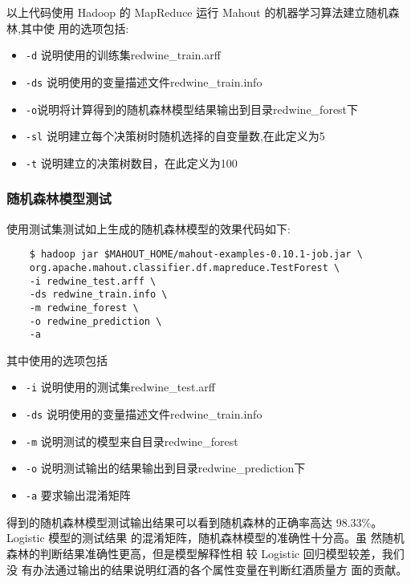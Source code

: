 以上代码使用 Hadoop 的 MapReduce 运行 Mahout
的机器学习算法建立随机森林,其中使 用的选项包括:

\begin{itemize}
\item
  \lstinline!-d! 说明使用的训练集redwine\_train.arff
\item
  \lstinline!-ds! 说明使用的变量描述文件redwine\_train.info
\item
  \lstinline!-o!说明将计算得到的随机森林模型结果输出到目录redwine\_forest下
\item
  \lstinline!-sl! 说明建立每个决策树时随机选择的自变量数,在此定义为5
\item
  \lstinline!-t! 说明建立的决策树数目，在此定义为100
\end{itemize}

\subsubsection{随机森林模型测试}\label{ux968fux673aux68eeux6797ux6a21ux578bux6d4bux8bd5}

使用测试集测试如上生成的随机森林模型的效果代码如下:

\begin{lstlisting}
	$ hadoop jar $MAHOUT_HOME/mahout-examples-0.10.1-job.jar \
	org.apache.mahout.classifier.df.mapreduce.TestForest \
	-i redwine_test.arff \
	-ds redwine_train.info \
	-m redwine_forest \
	-o redwine_prediction \
	-a
\end{lstlisting}

其中使用的选项包括

\begin{itemize}
\item
  \lstinline!-i! 说明使用的测试集redwine\_test.arff
\item
  \lstinline!-ds! 说明使用的变量描述文件redwine\_train.info
\item
  \lstinline!-m! 说明测试的模型来自目录redwine\_forest
\item
  \lstinline!-o! 说明测试输出的结果输出到目录redwine\_prediction下
\item
  \lstinline!-a! 要求输出混淆矩阵
\end{itemize}

得到的随机森林模型测试输出结果可以看到随机森林的正确率高达 98.33\%。
Logistic 模型的测试结果 的混淆矩阵，随机森林模型的准确性十分高。虽
然随机森林的判断结果准确性更高，但是模型解释性相 较 Logistic
回归模型较差，我们没
有办法通过输出的结果说明红酒的各个属性变量在判断红酒质量方 面的贡献。

